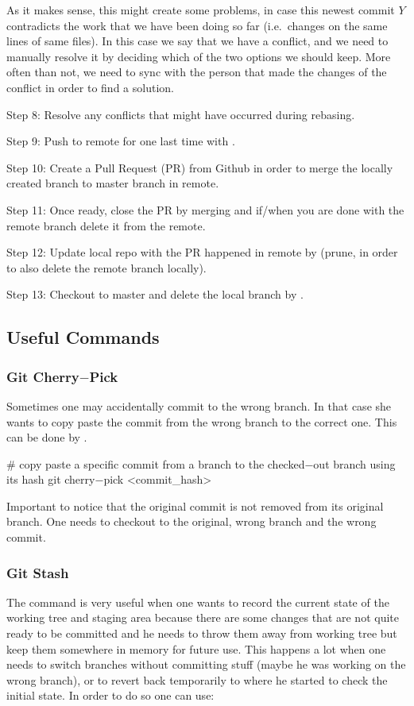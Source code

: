 As it makes sense, this might create some problems, in case this newest commit $Y$ contradicts the work that we have
been doing so far (i.e.\ changes on the same lines of same files). In this case we say that we have a conflict, and we
need to manually resolve it by deciding which of the two options we should keep. More often than not, we need to sync
with the person that made the changes of the conflict in order to find a solution.
\item Step 8: Resolve any conflicts that might have occurred during rebasing.
\item Step 9: Push to remote for one last time with .
\item Step 10: Create a Pull Request (PR) from Github in order to merge the locally created branch to master branch in
remote.
\item Step 11: Once ready, close the PR by merging and if/when you are done with the remote branch delete it from the
remote.
\item Step 12: Update local repo with the PR happened in remote by  (prune, in order to also
delete the remote branch locally).
\item Step 13: Checkout to master and delete the local branch by .
\eit

\subsection{Useful Commands}

\subsubsection{Git Cherry$-$Pick}

Sometimes one may accidentally commit to the wrong branch. In that case she wants to copy paste the commit from the
wrong branch to the correct one. This can be done by .

\begin{bash}
# copy paste a specific commit from a branch to the checked$-$out branch using its hash
git cherry$-$pick <commit_hash>
\end{bash}

Important to notice that the original commit is not removed from its original branch. One needs to checkout to the
original, wrong branch and  the wrong commit.

\subsubsection{Git Stash}
The  command is very useful when one wants to record the current state of the working tree and
staging area because there are some changes that are not quite ready to be committed and he needs to throw them away
from working tree but keep them somewhere in memory for future use. This happens a lot when one needs to switch
branches without committing stuff (maybe he was working on the wrong branch), or to revert back temporarily to where
he started to check the initial state. In order to do so one can use:

